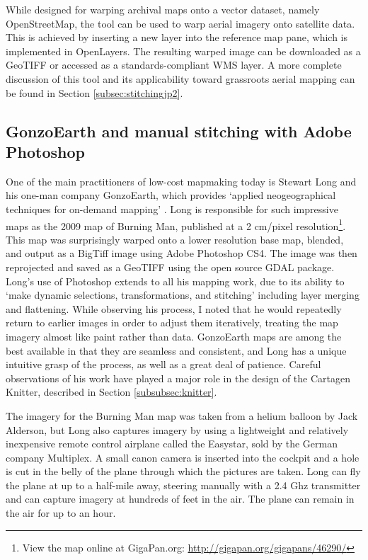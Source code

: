 \documentclass[11pt,oneside,notitlepage]{report}
\begin{document}
While designed for warping archival maps onto a vector dataset, namely OpenStreetMap, the tool can be used to warp aerial imagery onto satellite data. This is achieved by inserting a new layer into the reference map pane, which is implemented in OpenLayers. The resulting warped image can be downloaded as a \ac{GeoTIFF} or accessed as a standards-compliant WMS layer. A more complete discussion of this tool and its applicability toward grassroots aerial mapping can be found in Section \ref{subsec:stitchingjp2}.

\subsection{GonzoEarth and manual stitching with Adobe Photoshop}
\label{subsec:gonzoearth}

One of the main practitioners of low-cost mapmaking today is Stewart Long and his one-man company GonzoEarth, which provides `applied neogeographical techniques for on-demand mapping' \cite{long2010process}. Long is responsible for such impressive maps as the 2009 map of Burning Man, published at a 2 cm/pixel resolution\footnote{View the map online at GigaPan.org: \url{http://gigapan.org/gigapans/46290/}}. This map was surprisingly warped onto a lower resolution base map, blended, and output as a BigTiff image using Adobe Photoshop CS4. The image was then reprojected and saved as a \ac{GeoTIFF} using the open source GDAL package. Long's use of Photoshop extends to all his mapping work, due to its ability to `make dynamic selections, transformations, and stitching' including layer merging and flattening. \cite{long2010process} While observing his process, I noted that he would repeatedly return to earlier images in order to adjust them iteratively, treating the map imagery almost like paint rather than data. GonzoEarth maps are among the best available in that they are seamless and consistent, and Long has a unique intuitive grasp of the process, as well as a great deal of patience. Careful observations of his work have played a major role in the design of the Cartagen Knitter, described in Section \ref{subsubsec:knitter}. 

The imagery for the Burning Man map was taken from a helium balloon by Jack Alderson, but Long also captures imagery by using a lightweight and relatively inexpensive remote control airplane called the Easystar, sold by the German company Multiplex. A small canon camera is inserted into the cockpit and a hole is cut in the belly of the plane through which the pictures are taken. Long can fly the plane at up to a half-mile away, steering manually with a 2.4 Ghz transmitter and can capture imagery at hundreds of feet in the air. The plane can remain in the air for up to an hour.  
\end{document}
